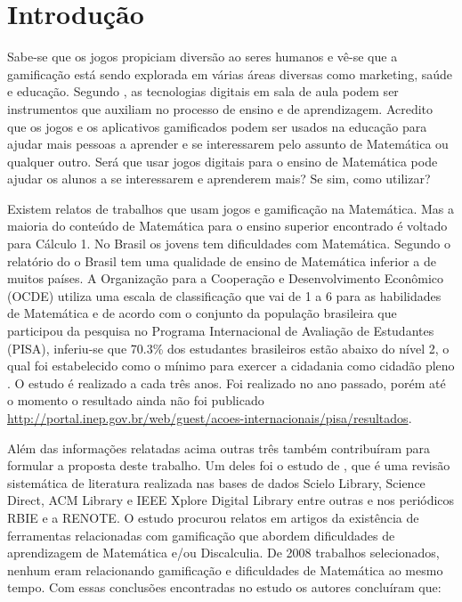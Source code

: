 \chapter[Introdução]{Introdução}


Sabe-se que os jogos propiciam diversão ao seres humanos e vê-se que a gamificação está sendo explorada em várias áreas diversas como marketing, saúde e educação. Segundo \cite{revbibmatgam}, as tecnologias digitais em sala de aula podem ser instrumentos que auxiliam no processo de ensino e de aprendizagem. Acredito que os jogos e os aplicativos gamificados podem ser usados na educação para ajudar mais pessoas a aprender e se interessarem pelo assunto de Matemática ou qualquer outro. Será que usar jogos digitais para o ensino de Matemática pode ajudar os alunos a se interessarem e aprenderem mais? Se sim, como utilizar? 

Existem relatos de trabalhos que usam jogos e gamificação na Matemática. Mas a maioria do conteúdo de Matemática para o ensino superior encontrado é voltado para Cálculo 1. No Brasil os jovens tem dificuldades com Matemática. Segundo o relatório do \cite{inep2015nivelcidadania} o Brasil tem uma qualidade de ensino de Matemática inferior a de muitos países. A Organização para a Cooperação e Desenvolvimento Econômico (OCDE) utiliza uma escala de classificação que vai de 1 a 6 para as habilidades de Matemática e de acordo com o conjunto da população brasileira que participou da pesquisa no Programa Internacional de Avaliação de Estudantes (PISA), inferiu-se que 70.3\% dos estudantes brasileiros estão abaixo do nível 2, o qual foi estabelecido como o mínimo para exercer a cidadania como cidadão pleno \cite{inep2015nivelcidadania}.
O estudo é realizado a cada três anos. Foi realizado no ano passado, porém até o momento o resultado ainda não foi publicado \url{http://portal.inep.gov.br/web/guest/acoes-internacionais/pisa/resultados}.

Além das informações relatadas acima outras três também contribuíram para formular a proposta deste trabalho. Um deles foi o estudo de \cite{revbibmatgam}, que é uma revisão sistemática de literatura realizada nas bases de dados Scielo Library, Science Direct, ACM Library e IEEE Xplore Digital Library entre outras e nos periódicos RBIE e a RENOTE. O estudo procurou relatos em artigos da existência de ferramentas relacionadas com gamificação que abordem dificuldades de aprendizagem de Matemática e/ou Discalculia. De 2008 trabalhos selecionados, nenhum eram relacionando gamificação e dificuldades de Matemática ao mesmo tempo. Com essas conclusões encontradas no estudo os autores \cite{revbibmatgam} concluíram que:

